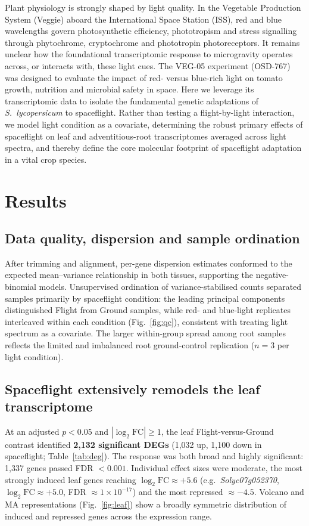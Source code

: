 \documentclass[10pt,twocolumn]{article}
\begin{document}
Plant physiology is strongly shaped by light quality. In the Vegetable Production
System (Veggie) aboard the International Space Station (ISS), red and blue wavelengths
govern photosynthetic efficiency, phototropism and stress signalling through
phytochrome, cryptochrome and phototropin photoreceptors. It remains unclear how the
foundational transcriptomic response to microgravity operates across, or interacts
with, these light cues. The VEG-05 experiment (OSD-767) was designed to evaluate the
impact of red- versus blue-rich light on tomato growth, nutrition and microbial
safety in space. Here we leverage its transcriptomic data to isolate the fundamental
genetic adaptations of \textit{S.\ lycopersicum} to spaceflight. Rather than testing a
flight-by-light interaction, we model light condition as a covariate, determining the
robust primary effects of spaceflight on leaf and adventitious-root transcriptomes
averaged across light spectra, and thereby define the core molecular footprint of
spaceflight adaptation in a vital crop species.

\section{Results}

\subsection{Data quality, dispersion and sample ordination}
After trimming and alignment, per-gene dispersion estimates conformed to the expected
mean--variance relationship in both tissues, supporting the negative-binomial models.
Unsupervised ordination of variance-stabilised counts separated samples primarily by
spaceflight condition: the leading principal components distinguished Flight from
Ground samples, while red- and blue-light replicates interleaved within each
condition (Fig.~\ref{fig:qc}), consistent with treating light spectrum as a covariate.
The larger within-group spread among root samples reflects the limited and imbalanced
root ground-control replication ($n=3$ per light condition).

\subsection{Spaceflight extensively remodels the leaf transcriptome}
At an adjusted $p<0.05$ and $|\log_2\text{FC}|\ge 1$, the leaf Flight-versus-Ground
contrast identified \textbf{2,132 significant DEGs} (1,032 up, 1,100 down in
spaceflight; Table~\ref{tab:deg}). The response was both broad and highly significant:
1,337 genes passed FDR $<0.001$. Individual effect sizes were moderate, the most
strongly induced leaf genes reaching $\log_2\text{FC}\approx +5.6$ (e.g.\
\textit{Solyc07g052370}, $\log_2\text{FC}\approx +5.0$, FDR $\approx 1\times10^{-17}$)
and the most repressed $\approx -4.5$. Volcano and MA representations
(Fig.~\ref{fig:leaf}) show a broadly symmetric distribution of induced and repressed
genes across the expression range.
\end{document}
